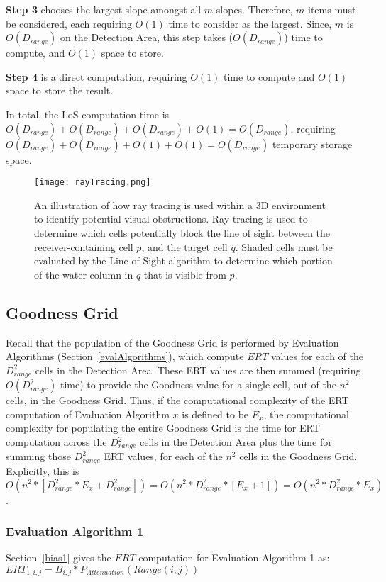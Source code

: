\noindent\textbf{Step 3} chooses the largest slope amongst all $m$ slopes.  Therefore, $m$ items must be considered, each requiring $O(1)$ time to consider as the largest.  Since, $m$ is $O(D_{range})$ on the Detection Area, this step takes ($O(D_{range})$) time to compute, and $O(1)$ space to store.  \newline

\noindent\textbf{Step 4} is a direct computation, requiring $O(1)$ time to compute and $O(1)$ space to store the result.\newline

In total, the LoS computation time is $O(D_{range}) + O(D_{range}) + O(D_{range}) + O(1) = O(D_{range})$, requiring $O(D_{range}) + O(D_{range}) + O(1) + O(1) = O(D_{range})$ temporary storage space.
\begin{figure}[ht]
	\label{rayTracingImg}
	\centering
	\texttt{[image: rayTracing.png]}
	\caption{An illustration of how ray tracing is used within a 3D environment to identify potential visual obstructions.  Ray tracing is used to determine which cells potentially block the line of sight between the receiver-containing cell $p$, and the target cell $q$.  Shaded cells must be evaluated by the Line of Sight algorithm to determine which portion of the water column in $q$ that is visible from $p$. \cite{Akbarzadeh2013}}
\end{figure}

\subsection{Goodness Grid}
Recall that the population of the Goodness Grid is performed by Evaluation Algorithms (Section~\ref{evalAlgorithms}), which compute $ERT$ values for each of the $D_{range}^2$ cells in the Detection Area.  These ERT values are then summed (requiring $O(D_{range}^2)$  time) to provide the Goodness value for a single cell, out of the $n^2$ cells, in the Goodness Grid.  Thus, if the computational complexity of the ERT computation of Evaluation Algorithm $x$ is defined to be $E_x$, the computational complexity for populating the entire Goodness Grid is the time for ERT computation across the $D_{range}^2$ cells in the Detection Area plus the time for summing those $D_{range}^2$ ERT values, for each of the $n^2$ cells in the Goodness Grid.  Explicitly, this is $O(n^2 * [D_{range}^2* E_x + D_{range}^2]) = O(n^2 * D_{range}^2 * [E_x + 1]) = O(n^2 * D_{range}^2 * E_x)$. 


\subsubsection{Evaluation Algorithm 1}
\label{bigObias1}
Section~\ref{bias1} gives the $ERT$ computation for Evaluation Algorithm 1 as:\newline
$ERT_{1,i,j} = B_{i,j} * P_{Attenuation}(Range(i,j))$

